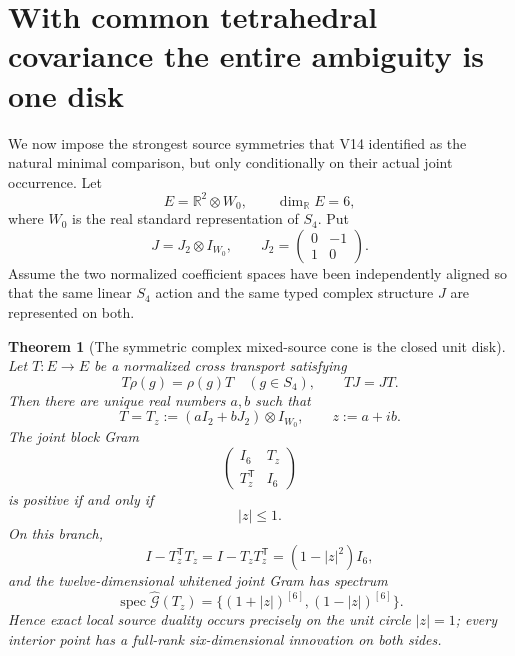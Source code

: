 \documentclass[11pt]{article}
\newtheorem{theorem}{Theorem}[section]
\theoremstyle{definition}
\theoremstyle{remark}
\newcommand{\R}{\mathbb R}
\newcommand{\spec}{\operatorname{spec}}
\begin{document}
\section{With common tetrahedral covariance the entire ambiguity is one disk}
\label{sec:v15-disk}

We now impose the strongest source symmetries that V14 identified as the
natural minimal comparison, but only conditionally on their actual joint
occurrence.  Let
\[
 E=\R^2\otimes W_0,
 \qquad \dim_\R E=6,
\]
where $W_0$ is the real standard representation of $S_4$.  Put
\[
 J=J_2\otimes I_{W_0},
 \qquad
 J_2=\begin{pmatrix}0&-1\\1&0\end{pmatrix}.
\]
Assume the two normalized coefficient spaces have been independently aligned
so that the same linear $S_4$ action and the same typed complex structure $J$
are represented on both.

\begin{theorem}[The symmetric complex mixed-source cone is the closed unit disk]
\label{thm:v15-disk}
Let $T:E\to E$ be a normalized cross transport satisfying
\[
 T\rho(g)=\rho(g)T\quad(g\in S_4),
 \qquad TJ=JT.
\]
Then there are unique real numbers $a,b$ such that
\begin{equation}
 \boxed{
 T=T_z:=(aI_2+bJ_2)\otimes I_{W_0},
 \qquad z:=a+ib.}
 \label{eq:v15-Tz}
\end{equation}
The joint block Gram
\[
 \begin{pmatrix}I_6&T_z\\T_z^{\mathsf T}&I_6\end{pmatrix}
\]
is positive if and only if
\begin{equation}
 \boxed{|z|\le1.}
 \label{eq:v15-disk-condition}
\end{equation}
On this branch,
\begin{equation}
 \boxed{
 I-T_z^{\mathsf T}T_z
 =I-T_zT_z^{\mathsf T}
 =(1-|z|^2)I_6,}
 \label{eq:v15-disk-short}
\end{equation}
and the twelve-dimensional whitened joint Gram has spectrum
\begin{equation}
 \boxed{
 \spec\widehat{\mathcal G}(T_z)
 =\{(1+|z|)^{[6]},(1-|z|)^{[6]}\}.}
 \label{eq:v15-block-spectrum}
\end{equation}
Hence exact local source duality occurs precisely on the unit circle
$|z|=1$; every interior point has a full-rank six-dimensional innovation on
both sides.
\end{theorem}
\end{document}
